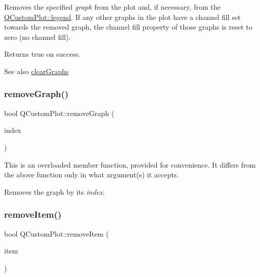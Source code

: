 Removes the specified {\itshape graph} from the plot and, if necessary, from the \mbox{\hyperlink{class_q_custom_plot_a4eadcd237dc6a09938b68b16877fa6af}{Q\+Custom\+Plot\+::legend}}. If any other graphs in the plot have a channel fill set towards the removed graph, the channel fill property of those graphs is reset to zero (no channel fill).

Returns true on success.

\begin{DoxySeeAlso}{See also}
\mbox{\hyperlink{class_q_custom_plot_ab0f3abff2d2f7df3668b5836f39207fa}{clear\+Graphs}} 
\end{DoxySeeAlso}
\mbox{\label{class_q_custom_plot_a9554b3d2d5b10c0f884bd4010b6c192c}} 
\subsubsection{\texorpdfstring{remove\+Graph()}{removeGraph()}\hspace{0.1cm}{\footnotesize\ttfamily [2/2]}}
{\footnotesize\ttfamily bool Q\+Custom\+Plot\+::remove\+Graph (\begin{DoxyParamCaption}\item[{int}]{index }\end{DoxyParamCaption})}

This is an overloaded member function, provided for convenience. It differs from the above function only in what argument(s) it accepts.

Removes the graph by its {\itshape index}. \mbox{\label{class_q_custom_plot_ae04446557292551e8fb6e2c106e1848d}} 
\subsubsection{\texorpdfstring{remove\+Item()}{removeItem()}\hspace{0.1cm}{\footnotesize\ttfamily [1/2]}}
{\footnotesize\ttfamily bool Q\+Custom\+Plot\+::remove\+Item (\begin{DoxyParamCaption}\item[{\mbox{\hyperlink{class_q_c_p_abstract_item}{Q\+C\+P\+Abstract\+Item}} $\ast$}]{item }\end{DoxyParamCaption})}

